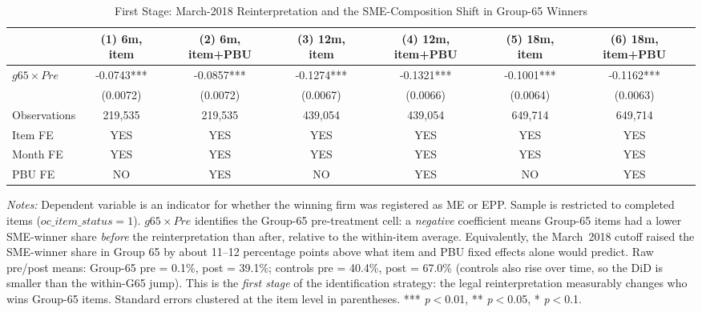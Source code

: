 \begin{table}[htbp]
\centering
\caption{First Stage: March-2018 Reinterpretation and the SME-Composition Shift in Group-65 Winners}
\label{tab:first_stage}
\begin{adjustbox}{max width=\textwidth}
\begin{threeparttable}
\small
\begin{tabular}{lcccccc}
\toprule
 & (1) 6m, item & (2) 6m, item+PBU & (3) 12m, item & (4) 12m, item+PBU & (5) 18m, item & (6) 18m, item+PBU \\
\midrule
$g65 \times Pre$ & -0.0743*** & -0.0857*** & -0.1274*** & -0.1321*** & -0.1001*** & -0.1162*** \\
 & (0.0072) & (0.0072) & (0.0067) & (0.0066) & (0.0064) & (0.0063) \\
\midrule
Observations & 219,535 & 219,535 & 439,054 & 439,054 & 649,714 & 649,714 \\
Item FE & YES & YES & YES & YES & YES & YES \\
Month FE & YES & YES & YES & YES & YES & YES \\
PBU FE & NO & YES & NO & YES & NO & YES \\
\bottomrule
\end{tabular}
\begin{tablenotes}
\small
\item \textit{Notes:} Dependent variable is an indicator for whether
the winning firm was registered as ME or EPP. Sample is restricted to
completed items ($oc\_item\_status = 1$). $g65 \times Pre$ identifies
the Group-65 pre-treatment cell: a \emph{negative} coefficient means
Group-65 items had a lower SME-winner share \emph{before} the
reinterpretation than after, relative to the within-item average.
Equivalently, the March~2018 cutoff raised the SME-winner share in Group
65 by about 11--12 percentage points above what item and PBU fixed effects
alone would predict. Raw pre/post means: Group-65 pre = 0.1\%, post =
39.1\%; controls pre = 40.4\%, post = 67.0\% (controls also rise over
time, so the DiD is smaller than the within-G65 jump). This is the
\emph{first stage} of the identification strategy: the legal
reinterpretation measurably changes who wins Group-65 items. Standard
errors clustered at the item level in parentheses.
*** \textit{p}$<$0.01, ** \textit{p}$<$0.05, * \textit{p}$<$0.1.
\end{tablenotes}
\end{threeparttable}
\end{adjustbox}
\end{table}
